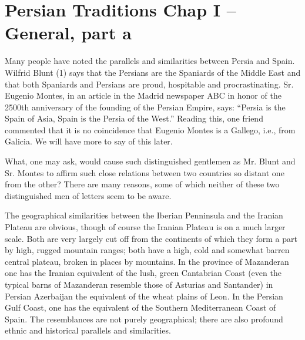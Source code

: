 \section{Persian Traditions Chap I – General, part a}

Many people have noted the parallels and similarities between Persia and Spain. Wilfrid Blunt (1) says that the Persians are the Spaniards of the Middle East and that both Spaniards and Persians are proud, hospitable and procrastinating. Sr. Eugenio Montes, in an article in the Madrid newspaper ABC in honor of the 2500th anniversary of the founding of the Persian Empire, says: ``Persia is the Spain of Asia, Spain is the Persia of the West.'' Reading this, one friend commented that it is no coincidence that Eugenio Montes is a Gallego, i.e., from Galicia. We will have more to say of this later.

What, one may ask, would cause such distinguished gentlemen as Mr. Blunt and Sr. Montes to affirm such close relations between two countries so distant one from the other? There are many reasons, some of which neither of these two distinguished men of letters seem to be aware.

The geographical similarities between the Iberian Penninsula and the Iranian Plateau are obvious, though of course the Iranian Plateau is on a much larger scale. Both are very largely cut off from the continents of which they form a part by high, rugged mountain ranges; both have a high, cold and somewhat barren central plateau, broken in places by mountains. In the province of Mazanderan one has the Iranian equivalent of the lush, green Cantabrian Coast (even the typical barns of Mazanderan resemble those of Asturias and Santander) in Persian Azerbaijan the equivalent of the wheat plains of Leon. In the Persian Gulf Coast, one has the equivalent of the Southern Mediterranean Coast of Spain. The resemblances are not purely geographical; there are also profound ethnic and historical parallels and similarities.

